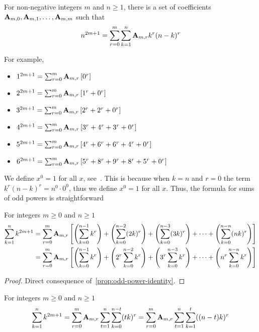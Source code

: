 \begin{proposition}
    \label{prop:odd-power-identity}
    For non-negative integers $m$ and $n \geq 1$,
    there is a set of coefficients ${\mathbf{A}} \sb{m,0}, {\mathbf{A}} \sb{m,1}, \ldots, {\mathbf{A}} \sb{m,m}$ such that
    \begin{align*}
        n^{2m+1} = \sum_{r=0}^{m} \sum_{k=1}^{n} {\mathbf{A}} \sb{m,r} k^r (n-k)^r
    \end{align*}
\end{proposition}
For example,
\begin{itemize}
    \item $1^{2m+1} = \sum_{r=0}^{m} {\mathbf{A}} \sb{m,r} \left[ 0^r  \right]$
    \item $2^{2m+1} = \sum_{r=0}^{m} {\mathbf{A}} \sb{m,r} \left[ 1^r + 0^r  \right]$
    \item $3^{2m+1} = \sum_{r=0}^{m} {\mathbf{A}} \sb{m,r} \left[ 2^r + 2^r + 0^r  \right]$
    \item $4^{2m+1} = \sum_{r=0}^{m} {\mathbf{A}} \sb{m,r} \left[ 3^r + 4^r + 3^r + 0^r  \right]$
    \item $5^{2m+1} = \sum_{r=0}^{m} {\mathbf{A}} \sb{m,r} \left[ 4^r + 6^r + 6^r + 4^r + 0^r  \right]$
    \item $6^{2m+1} = \sum_{r=0}^{m} {\mathbf{A}} \sb{m,r} \left[ 5^r + 8^r + 9^r + 8^r + 5^r + 0^r  \right]$
\end{itemize}
We define $x^0 = 1$ for all $x$, see~\cite[~p. 162]{graham1994concrete}.
This is because when $k=n$ and $r=0$ the term $k^r (n-k)^r = n^0 \cdot 0^0$, thus we define $x^0 = 1$
for all $x$.
Thus, the formula for sums of odd powers is straightforward
\begin{proposition}
    For integers $m\geq 0$ and $n \geq 1$
    \begin{align*}
        \sum_{k=1}^{n} k^{2m+1}
        &= \sum_{r=0}^{m} {\mathbf{A}} \sb{m,r} \left[ \left( \sum_{k=0}^{n-1} k^r \right) +  \left( \sum_{k=0}^{n-2} (2k)^r \right) + \left( \sum_{k=0}^{n-3} (3k)^r \right)+ \cdots + \left( \sum_{k=0}^{n-n} (nk)^r \right) \right] \\
        &= \sum_{r=0}^{m} {\mathbf{A}} \sb{m,r} \left[ \left( \sum_{k=0}^{n-1} k^r \right) +  \left( 2^r \sum_{k=0}^{n-2} k^r \right) + \left( 3^r \sum_{k=0}^{n-3} k^r \right)+ \cdots + \left( n^r \sum_{k=0}^{n-n} k^r \right) \right]
    \end{align*}
    \begin{proof}
        Direct consequence of~\eqref{prop:odd-power-identity}.
    \end{proof}
\end{proposition}
\begin{corollary}
    For integers $m\geq 0$ and $n \geq 1$
    \begin{align*}
        \sum_{k=1}^{n} k^{2m+1} = \sum_{r=0}^{m} {\mathbf{A}} \sb{m,r} \sum_{t=1}^{n} \sum_{k=0}^{n-t} (tk)^r = \sum_{r=0}^{m} {\mathbf{A}} \sb{m,r} \sum_{t=1}^{n} \sum_{k=1}^{t} ((n-t)k)^r
    \end{align*}
\end{corollary}

